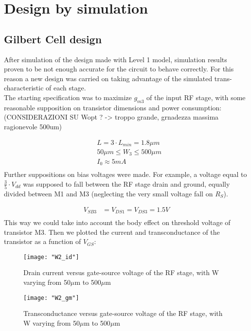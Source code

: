 \section{Design by simulation}

\subsection{Gilbert Cell design}
After simulation of the design made with Level 1 model, simulation results proven to be not enough accurate for the circuit to behave correctly.
For this reason a new design was carried on taking advantage of the simulated trans-characteristic of each stage.\\
The starting specification was to maximize \(g_{m3}\) of the input RF stage, with some reasonable supposition on transistor dimensions and power consumption:
(CONSIDERAZIONI SU Wopt ? -> troppo grande, grnadezza massima ragionevole 500um)

\begin{align}
	&L=3\cdot L_{min} = 1.8\mu m \nonumber\\
	&50 \mu m \le W_3 \le 500 \mu m \nonumber \\
	&I_0 \approx 5mA \nonumber \\
\end{align}
Further suppositions on bias voltages were made. For example, a voltage equal to \(\frac{3}{5}\cdot V_{dd}\) was supposed to fall between the RF stage drain and ground, equally divided between M1 and M3 (neglecting the very small voltage fall on \(R_S\)). 

\begin{align}
	V_{SB3} &= V_{DS1} = V_{DS3} = 1.5 V \nonumber \\
\end{align}
This way we could take into account the body effect on threshold voltage of transistor M3.
Then we plotted the current and transconductance of the transistor as a function of \(V_{GS}\):

\begin{figure}[H]
	\centering
	\texttt{[image: "W2\_id"]}
	\caption{Drain current versus gate-source voltage of the RF stage, with W varying from 50\(\mu\)m to 500\(\mu\)m}
	\label{W2_id}
\end{figure}
\begin{figure}[H]
	\centering
	\texttt{[image: "W2\_gm"]}
	\caption{Transconductance versus gate-source voltage of the RF stage, with W varying from 50\(\mu\)m to 500\(\mu\)m}
	\label{W2_gm}
\end{figure}

